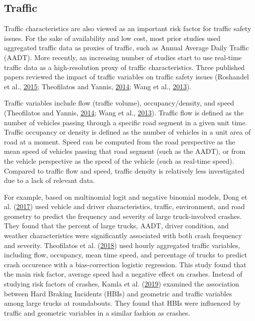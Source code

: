 \documentclass[12pt]{book}
\numberwithin{equation}{chapter}
\begin{document}
\hypertarget{traffic}{%
\subsection{Traffic}\label{traffic}}

Traffic characteristics are also viewed as an important risk factor for traffic safety issues. For the sake of availability and low cost, most prior studies used aggregated traffic data as proxies of traffic, such as Annual Average Daily Traffic (AADT). More recently, an increasing number of studies start to use real-time traffic data as a high-resolution proxy of traffic characteristics. Three published papers reviewed the impact of traffic variables on traffic safety issues (Roshandel et al., \protect\hyperlink{ref-roshandel2015impact}{2015}; Theofilatos and Yannis, \protect\hyperlink{ref-theofilatos2014review}{2014}; Wang et al., \protect\hyperlink{ref-wang2013effect}{2013}).

Traffic variables include flow (traffic volume), occupancy/density, and speed (Theofilatos and Yannis, \protect\hyperlink{ref-theofilatos2014review}{2014}; Wang et al., \protect\hyperlink{ref-wang2013effect}{2013}). Traffic flow is defined as the number of vehicles passing through a specific road segment in a given unit time. Traffic occupancy or density is defined as the number of vehicles in a unit area of road at a moment. Speed can be computed from the road perspective as the mean speed of vehicles passing that road segment (such as the AADT), or from the vehicle perspective as the speed of the vehicle (such as real-time speed). Compared to traffic flow and speed, traffic density is relatively less investigated due to a lack of relevant data.

For example, based on multinomial logit and negative binomial models, Dong et al. (\protect\hyperlink{ref-dong2017estimating}{2017}) used vehicle and driver characteristics, traffic, environment, and road geometry to predict the frequency and severity of large truck-involved crashes. They found that the percent of large trucks, AADT, driver condition, and weather characteristics were significantly associated with both crash frequency and severity. Theofilatos et al. (\protect\hyperlink{ref-theofilatos2018impact}{2018}) used hourly aggregated traffic variables, including flow, occupancy, mean time speed, and percentage of trucks to predict crash occurence with a bias-correction logistic regression. This study found that the main risk factor, average speed had a negative effect on crashes. Instead of studying risk factors of crashes, Kamla et al. (\protect\hyperlink{ref-kamla2019analysing}{2019}) examined the association between Hard Braking Incidents (HBIs) and geometric and traffic variables among large trucks at roundabouts. They found that HBIs were influenced by traffic and geometric variables in a similar fashion as crashes.
\end{document}
